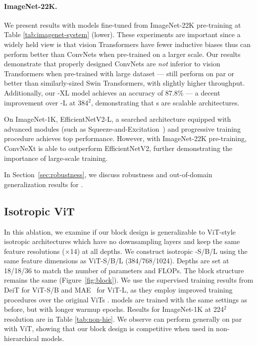 \paragraph{ImageNet-22K.}
We present results with models fine-tuned from ImageNet-22K pre-training at Table \ref{tab:imagenet-system} (lower). 
These experiments are important since a widely held view is that vision Transformers have fewer inductive biases thus can perform better than ConvNets when pre-trained on a larger scale. 
 Our results demonstrate that properly designed ConvNets are \emph{not} inferior to vision Transformers when pre-trained with large dataset ---  still perform on par or better than similarly-sized Swin Transformers, with slightly higher throughput. Additionally, our \cnn{}-XL model achieves an accuracy of 87.8\% --- a decent improvement over \cnn{}-L at 384$^2$, demonstrating that \cnn{}s are scalable architectures. 
 
On ImageNet-1K, EfficientNetV2-L, a searched architecture equipped with advanced modules (such as Squeeze-and-Excitation~\cite{hu2018squeeze}) and progressive training procedure achieves top performance. However, with ImageNet-22K pre-training, ConvNeXt is able to outperform EfficientNetV2, further demonstrating the importance of large-scale training.

In Section~\ref{sec:robustness}, we discuss robustness and out-of-domain generalization results for \cnn{}.

\subsection{Isotropic \cnn{} \vs ViT}
\label{subsec:isotropic} 
In this ablation, we examine if our \cnn{} block design is generalizable to ViT-style~\cite{Dosovitskiy2021} isotropic architectures which have no downsampling layers and keep the same feature resolutions ($\times$14) at all depths. We construct isotropic \cnn{}-S/B/L using the same feature dimensions as ViT-S/B/L (384/768/1024). Depths are set at 18/18/36 to match the number of parameters and FLOPs. The block structure remains the same (Figure~\ref{fig:block}).
We use the supervised training results from DeiT \cite{Touvron2020} for ViT-S/B and MAE~\cite{he2021masked} for ViT-L, as they employ improved training procedures over the original ViTs \cite{Dosovitskiy2021}. \cnn{} models are trained with the same settings as before, but with longer warmup epochs. Results for ImageNet-1K at 224$^2$ resolution are in Table \ref{tab:non-hie}. We observe \cnn{} can perform generally on par with ViT, showing that our \cnn{} block design is competitive when used in non-hierarchical models. 

